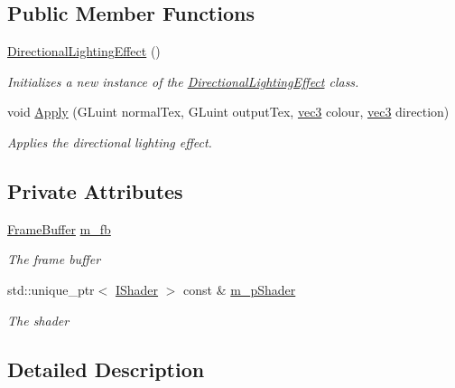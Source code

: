 \subsection*{Public Member Functions}
\begin{DoxyCompactItemize}
\item 
\hyperlink{class_directional_lighting_effect_a4ee635d9d9ed5ce5ebb5cef463e67723}{Directional\+Lighting\+Effect} ()
\begin{DoxyCompactList}\small\item\em Initializes a new instance of the \hyperlink{class_directional_lighting_effect}{Directional\+Lighting\+Effect} class. \end{DoxyCompactList}\item 
void \hyperlink{class_directional_lighting_effect_a8cca766638f16ac83b4339e5855e0a8f}{Apply} (G\+Luint normal\+Tex, G\+Luint output\+Tex, \hyperlink{_types_8h_a3d0ce73e3199de81565fb01632415288}{vec3} colour, \hyperlink{_types_8h_a3d0ce73e3199de81565fb01632415288}{vec3} direction)
\begin{DoxyCompactList}\small\item\em Applies the directional lighting effect. \end{DoxyCompactList}\end{DoxyCompactItemize}
\subsection*{Private Attributes}
\begin{DoxyCompactItemize}
\item 
\hyperlink{class_frame_buffer}{Frame\+Buffer} \hyperlink{class_directional_lighting_effect_a7e94bd539e7cb254d32bdffa4d8aae57}{m\+\_\+fb}
\begin{DoxyCompactList}\small\item\em The frame buffer \end{DoxyCompactList}\item 
std\+::unique\+\_\+ptr$<$ \hyperlink{class_i_shader}{I\+Shader} $>$ const \& \hyperlink{class_directional_lighting_effect_ad53c001d1de64b1b539b68d5de943c4f}{m\+\_\+p\+Shader}
\begin{DoxyCompactList}\small\item\em The shader \end{DoxyCompactList}\end{DoxyCompactItemize}


\subsection{Detailed Description}


